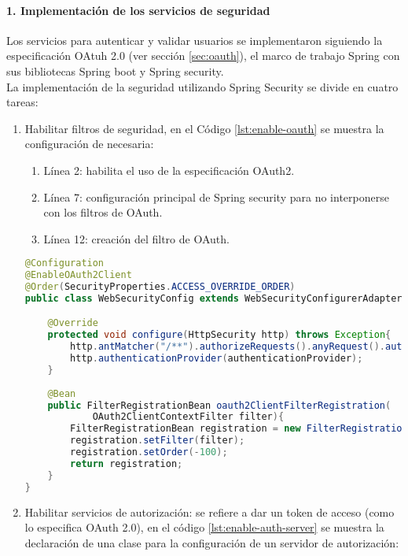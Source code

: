 \paragraph{1. Implementación de los servicios de seguridad\\}
Los servicios para autenticar y validar usuarios se implementaron siguiendo la especificación OAtuh 2.0 (ver sección \ref{sec:oauth}), el marco de trabajo Spring con sus bibliotecas Spring boot y Spring security.\\
La implementación de la seguridad utilizando Spring Security se divide en cuatro tareas:
\begin{enumerate}
	\item Habilitar filtros de seguridad, en el Código \ref{lst:enable-oauth} se muestra la configuración de necesaria:
	\begin{enumerate}
		\item Línea 2: habilita el uso de la especificación OAuth2.
		\item Línea 7: configuración principal de Spring security para no interponerse con los filtros de OAuth.
		\item Línea 12: creación del filtro de OAuth.
	\end{enumerate}
\begin{lstlisting}[language=Java, caption={Clase para habilitar los filtros de seguridad.}, captionpos=b, label={lst:enable-oauth}]
@Configuration
@EnableOAuth2Client
@Order(SecurityProperties.ACCESS_OVERRIDE_ORDER)
public class WebSecurityConfig extends WebSecurityConfigurerAdapter{

	@Override
	protected void configure(HttpSecurity http) throws Exception{
		http.antMatcher("/**").authorizeRequests().anyRequest().authenticated().and().logout().logoutSuccessUrl("/").permitAll().and().sessionManagement().sessionCreationPolicy(SessionCreationPolicy.STATELESS).and().csrf().disable();
		http.authenticationProvider(authenticationProvider);
	}
	
	@Bean
	public FilterRegistrationBean oauth2ClientFilterRegistration(
			OAuth2ClientContextFilter filter){
		FilterRegistrationBean registration = new FilterRegistrationBean();
		registration.setFilter(filter);
		registration.setOrder(-100);
		return registration;
	}
}	
\end{lstlisting}

	\item Habilitar servicios de autorización: se refiere a dar un token de acceso (como lo especifica OAuth 2.0), en el código \ref{lst:enable-auth-server} se muestra la declaración de una clase para la configuración de un servidor de autorización:


\end{enumerate}
